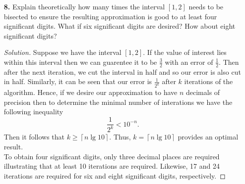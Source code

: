 \documentclass[ 12pt ]{article}
\begin{document}
\begin{enumerate}
\begin{proof}[Solution]
\begin{lstlisting}[basicstyle=\ttfamily\footnotesize, numbers=left, tabsize=4, frame=single]
end
			\end{lstlisting}
			Additionally, the following function is of importance.
			\begin{lstlisting}[basicstyle=\ttfamily\footnotesize, numbers=left, tabsize=4, frame=single]
# div: determines if sequence s diverges with initial value s_1
# 	computes first few indices to see if they become large
function div( s_1, s )
	for i in 1:50
		if s( s_1, i ) > 100
			return true
		end
	end
	return false
end
			\end{lstlisting}
			In the above code, the function \verb|bisect| performs the entirety of the bisection method returning the approximated value to the proper accuracy. The \verb|div|
			determines if a provided sequence will diverge with a given initial condition. The function is passed as a parameter to \verb|bisect| as the bisection condition.
			Computing $\alpha_*$ to four decimal places can be done via \\ \verb|Bisection.bisect( 4, 1, 2, Sequence.x_odd, div )| which provides 1.18743896484375.
		\end{proof}


	\item[\textbf{8.}] Explain theoretically how many times the interval $[1, 2]$ needs to be bisected to ensure the resulting approximation is good to at least four significant digits.
		What if six significant digits are desired? How about eight significant digits?

		\begin{proof}[Solution]\renewcommand{\qedsymbol}{}
			Suppose we have the interval $[1, 2]$. If the value of interest lies within this interval then we can guarentee it to be $\frac{3}{2}$ with an error of $\frac{1}{2}$.
			Then after the next iteration, we cut the interval in half and so our error is also cut in half. Similarly, it can be seen that our error is $\frac{1}{2^k}$ after $k$
			iterations of the algorithm. Hence, if we desire our approximation to have $n$ decimals of precision then to determine the minimal number of interations we have the
			following inequality $$\frac{1}{2^k} < 10^{-n}.$$ Then it follows that $k \geq \left \lceil n \lg 10 \right \rceil$. Thus, $k = \left \lceil n \lg 10 \right \rceil$
			provides an optimal result. \\

			To obtain four significant digits, only three decimal places are required illustrating that at least 10 iterations are required. Likewise, 17 and 24 iterations are
			required for six and eight significant digits, respectively.
		\end{proof}



\end{enumerate}
\end{document}
